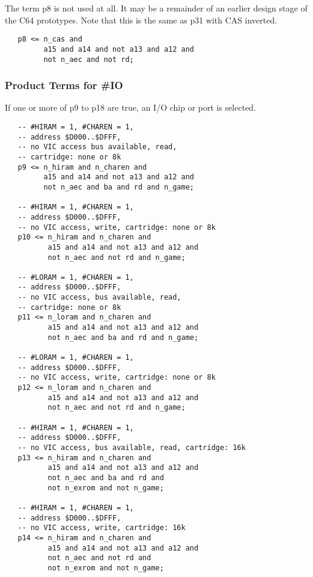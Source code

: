 The term p8 is not used at all. It may be a remainder of an earlier design
stage of the C64 prototypes. Note that this is the same as p31 with CAS
inverted.

\begin{lstlisting}
   p8 <= n_cas and
         a15 and a14 and not a13 and a12 and
         not n_aec and not rd;
\end{lstlisting}

\subsubsection{Product Terms for \#IO}
\label{sec:pterms-io}

If one or more of p9 to p18 are true, an I/O chip or port is selected.

\begin{lstlisting}
   -- #HIRAM = 1, #CHAREN = 1,
   -- address $D000..$DFFF,
   -- no VIC access bus available, read,
   -- cartridge: none or 8k
   p9 <= n_hiram and n_charen and
         a15 and a14 and not a13 and a12 and
         not n_aec and ba and rd and n_game;

   -- #HIRAM = 1, #CHAREN = 1,
   -- address $D000..$DFFF,
   -- no VIC access, write, cartridge: none or 8k
   p10 <= n_hiram and n_charen and
          a15 and a14 and not a13 and a12 and
          not n_aec and not rd and n_game;

   -- #LORAM = 1, #CHAREN = 1,
   -- address $D000..$DFFF,
   -- no VIC access, bus available, read,
   -- cartridge: none or 8k
   p11 <= n_loram and n_charen and
          a15 and a14 and not a13 and a12 and
          not n_aec and ba and rd and n_game;

   -- #LORAM = 1, #CHAREN = 1,
   -- address $D000..$DFFF,
   -- no VIC access, write, cartridge: none or 8k
   p12 <= n_loram and n_charen and
          a15 and a14 and not a13 and a12 and
          not n_aec and not rd and n_game;

   -- #HIRAM = 1, #CHAREN = 1,
   -- address $D000..$DFFF,
   -- no VIC access, bus available, read, cartridge: 16k
   p13 <= n_hiram and n_charen and
          a15 and a14 and not a13 and a12 and
          not n_aec and ba and rd and
          not n_exrom and not n_game;

   -- #HIRAM = 1, #CHAREN = 1,
   -- address $D000..$DFFF,
   -- no VIC access, write, cartridge: 16k
   p14 <= n_hiram and n_charen and
          a15 and a14 and not a13 and a12 and
          not n_aec and not rd and
          not n_exrom and not n_game;


\end{lstlisting}
